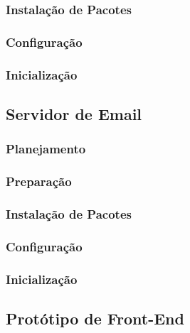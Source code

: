 \subsubsection{Instalação de Pacotes}
\subsubsection{Configuração}
\subsubsection{Inicialização}



\subsection{Servidor de Email}
\label{sub:email}

\subsubsection{Planejamento}
\subsubsection{Preparação}
\subsubsection{Instalação de Pacotes}
\subsubsection{Configuração}
\subsubsection{Inicialização}


\subsection{Protótipo de Front-End}
\label{sub:prototipo}

